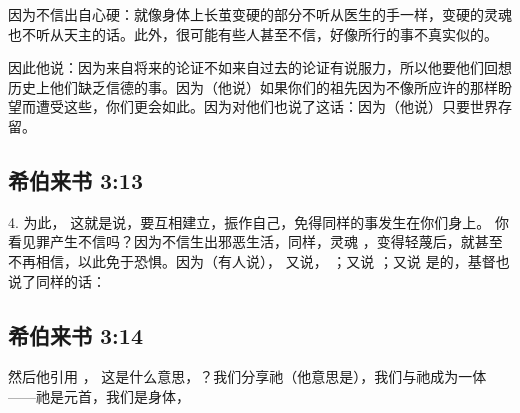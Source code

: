因为不信出自心硬：就像身体上长茧变硬的部分不听从医生的手一样，变硬的灵魂也不听从天主的话。此外，很可能有些人甚至不信，好像所行的事不真实似的。\par

因此他说：因为来自将来的论证不如来自过去的论证有说服力，所以他要他们回想历史上他们缺乏信德的事。因为（他说）如果你们的祖先因为不像所应许的那样盼望而遭受这些，你们更会如此。因为对他们也说了这话：因为（他说）只要世界存留。\par


\subsection{希伯来书 3:13}

4. 为此， 这就是说，要互相建立，振作自己，免得同样的事发生在你们身上。 你看见罪产生不信吗？因为不信生出邪恶生活，同样，灵魂 ，变得轻蔑后，就甚至不再相信，以此免于恐惧。因为（有人说），  又说， ；又说 ；又说    是的，基督也说了同样的话： \par


\subsection{希伯来书 3:14}

然后他引用 ， 这是什么意思，？我们分享祂（他意思是），我们与祂成为一体——祂是元首，我们是身体， \par

